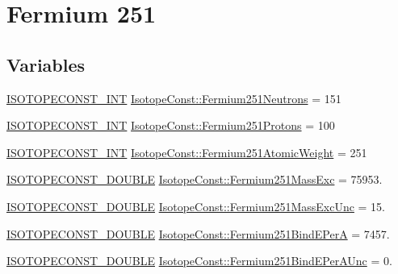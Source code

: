 \hypertarget{group___isotope_const-_fermium-_fm251}{}\section{Fermium 251}
\label{group___isotope_const-_fermium-_fm251}
\subsection*{Variables}
\begin{DoxyCompactItemize}
\item 
\mbox{\hyperlink{group___isotope_const-_macros_ga5f18360b3e99483a35c32d789e62621c}{I\+S\+O\+T\+O\+P\+E\+C\+O\+N\+S\+T\+\_\+\+I\+NT}} \mbox{\hyperlink{group___isotope_const-_fermium-_fm251_gaf647efa8bf811a017705330310972c07}{Isotope\+Const\+::\+Fermium251\+Neutrons}} = 151
\item 
\mbox{\hyperlink{group___isotope_const-_macros_ga5f18360b3e99483a35c32d789e62621c}{I\+S\+O\+T\+O\+P\+E\+C\+O\+N\+S\+T\+\_\+\+I\+NT}} \mbox{\hyperlink{group___isotope_const-_fermium-_fm251_gaf4b6c2db155ca7fa771e55da220259e6}{Isotope\+Const\+::\+Fermium251\+Protons}} = 100
\item 
\mbox{\hyperlink{group___isotope_const-_macros_ga5f18360b3e99483a35c32d789e62621c}{I\+S\+O\+T\+O\+P\+E\+C\+O\+N\+S\+T\+\_\+\+I\+NT}} \mbox{\hyperlink{group___isotope_const-_fermium-_fm251_ga74b66d4b6d22b9d503c53cff97e39a68}{Isotope\+Const\+::\+Fermium251\+Atomic\+Weight}} = 251
\item 
\mbox{\hyperlink{group___isotope_const-_macros_ga8f45a7272ce02c0b4c65c44636ed719a}{I\+S\+O\+T\+O\+P\+E\+C\+O\+N\+S\+T\+\_\+\+D\+O\+U\+B\+LE}} \mbox{\hyperlink{group___isotope_const-_fermium-_fm251_ga55f1a400a94872ae3c97445b7a90d77b}{Isotope\+Const\+::\+Fermium251\+Mass\+Exc}} = 75953.
\item 
\mbox{\hyperlink{group___isotope_const-_macros_ga8f45a7272ce02c0b4c65c44636ed719a}{I\+S\+O\+T\+O\+P\+E\+C\+O\+N\+S\+T\+\_\+\+D\+O\+U\+B\+LE}} \mbox{\hyperlink{group___isotope_const-_fermium-_fm251_ga10a0c455f48f83b154b847ac539bb8f6}{Isotope\+Const\+::\+Fermium251\+Mass\+Exc\+Unc}} = 15.
\item 
\mbox{\hyperlink{group___isotope_const-_macros_ga8f45a7272ce02c0b4c65c44636ed719a}{I\+S\+O\+T\+O\+P\+E\+C\+O\+N\+S\+T\+\_\+\+D\+O\+U\+B\+LE}} \mbox{\hyperlink{group___isotope_const-_fermium-_fm251_ga36d28875be47a58300e3ff0a767db71b}{Isotope\+Const\+::\+Fermium251\+Bind\+E\+PerA}} = 7457.
\item 
\mbox{\hyperlink{group___isotope_const-_macros_ga8f45a7272ce02c0b4c65c44636ed719a}{I\+S\+O\+T\+O\+P\+E\+C\+O\+N\+S\+T\+\_\+\+D\+O\+U\+B\+LE}} \mbox{\hyperlink{group___isotope_const-_fermium-_fm251_ga928924e51872e099977a25f606ba17cb}{Isotope\+Const\+::\+Fermium251\+Bind\+E\+Per\+A\+Unc}} = 0.

\end{DoxyCompactItemize}

